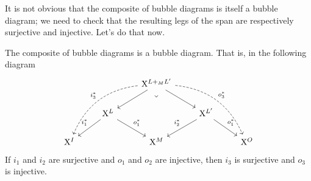 \documentclass[DynamicalBook]{subfiles}
\begin{document}
  It is not obvious that the composite of bubble diagrams is itself a bubble diagram; we need to check that the resulting legs of the span are respectively surjective and injective. Let's do that now.
  \begin{lemma}
    The composite of bubble diagrams is a bubble diagram. That is, in the following diagram
\[
\begin{tikzcd}
	&& {\XX^{L +_M L'}} \\
	& {\XX^L} && {\XX^{L'}} \\
	{\XX^{I}} && {\XX^{M}} && {\XX^{O}}
	\arrow[from=2-2, to=3-1, "i_{1}^{\ast}"']
	\arrow[from=2-2, to=3-3, "o_{1}^{\ast}"]
	\arrow[from=2-4, to=3-3, "i_{2}^{\ast}"']
	\arrow[from=1-3, to=2-2]
	\arrow[from=1-3, to=2-4]
	\arrow[from=2-4, to=3-5, "o_{1}^{\ast}"]
	\arrow["\lrcorner"{anchor=center, pos=0.125, rotate=-45}, draw=none, from=1-3, to=3-3]
	\arrow[bend right = 30, dashed, from=1-3, to=3-1, "i_{3}^{\ast}"']
	\arrow[bend left = 30, dashed, from=1-3, to=3-5, "o_{3}^{\ast}" ]
\end{tikzcd}
\]
If $i_{1}$ and $i_{2}$ are surjective and $o_{1}$ and $o_{2}$ are injective, then $i_{3}$ is surjective and $o_{3}$ is injective.
    \end{lemma}
\end{document}
